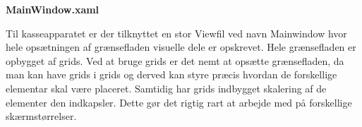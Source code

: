 \textbf{MainWindow.xaml}

Til kasseapparatet er der tilknyttet en stor Viewfil ved navn Mainwindow hvor hele opsætningen af grænsefladen visuelle dele er opskrevet. Hele grænsefladen er opbygget af grids. Ved at bruge grids er det nemt at opsætte grænsefladen, da man kan have grids i grids og derved kan styre præcis hvordan de forskellige elementar skal være placeret. Samtidig har grids indbygget skalering af de elementer den indkapsler. Dette gør det rigtig rart at arbejde med på forskellige skærmstørrelser.